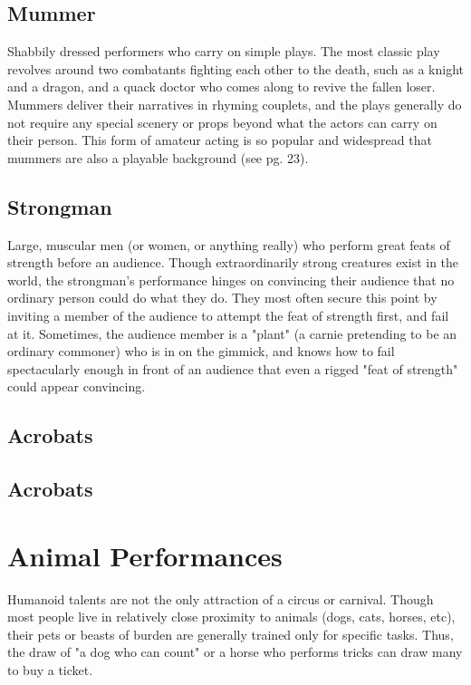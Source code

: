 \documentclass[10pt,a4paper,twoside,twocolumn,openany,bg=print,nodeprecatedcode]{dndbook}
\begin{document}
\subsection{Mummer}
Shabbily dressed performers who carry on simple plays. The most classic play revolves around two combatants fighting each other to the death, such as a knight and a dragon, and a quack doctor who comes along to revive the fallen loser. Mummers deliver their narratives in rhyming couplets, and the plays generally do not require any special scenery or props beyond what the actors can carry on their person. This form of amateur acting is so popular and widespread that mummers are also a playable background (see pg. 23).
\subsection{Strongman}
Large, muscular men (or women, or anything really) who perform great feats of strength before an audience. Though extraordinarily strong creatures exist in the world, the strongman's performance hinges on convincing their audience that no ordinary person could do what they do. They most often secure this point by inviting a member of the audience to attempt the feat of strength first, and fail at it. Sometimes, the audience member is a "plant" (a carnie pretending to be an ordinary commoner) who is in on the gimmick, and knows how to fail spectacularly enough in front of an audience that even a rigged "feat of strength" could appear convincing.
\subsection{Acrobats}

\subsection{Acrobats}

\section{Animal Performances}
Humanoid talents are not the only attraction of a circus or carnival. Though most people live in relatively close proximity to animals (dogs, cats, horses, etc), their pets or beasts of burden are generally trained only for specific tasks. Thus, the draw of "a dog who can count" or a horse who performs tricks can draw many to buy a ticket.
\end{document}
